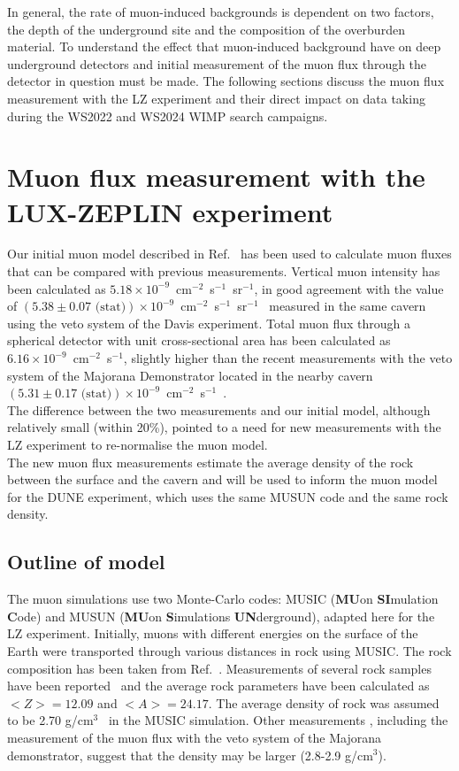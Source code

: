 In general, the rate of muon-induced backgrounds is dependent on two factors, the depth of the underground site and the composition of the overburden material. To understand the effect that muon-induced background have on deep underground detectors and initial measurement of the muon flux through the detector in question must be made. The following sections discuss the muon flux measurement with the LZ experiment and their direct impact on data taking during the WS2022 and WS2024 WIMP search campaigns.  

\section{Muon flux measurement with the LUX-ZEPLIN experiment}\label{sec:Muons/MuonFluxMeasurementWithLZ}
Our initial muon model described in Ref.~\cite{LZ_SIMS} has been used to calculate muon fluxes that can be compared with previous measurements. Vertical muon intensity has been calculated as $5.18\times10^{-9}$~cm$^{-2}$~s$^{-1}$~sr$^{-1}$, in good agreement with the value of $(5.38\pm0.07\text{ (stat)})\times10^{-9}$~cm$^{-2}$~s$^{-1}$~sr$^{-1}$~\cite{Cherry} measured in the same cavern using the veto system of the Davis experiment. Total muon flux through a spherical detector with unit cross-sectional area has been calculated as $6.16\times10^{-9}$~cm$^{-2}$~s$^{-1}$, slightly higher than the recent measurements with the veto system of the Majorana Demonstrator located in the nearby cavern $(5.31\pm0.17 \text{ (stat)})\times10^{-9}$~cm$^{-2}$~s$^{-1}$~\cite{majorana}.\\
The difference between the two measurements and our initial model, although relatively small (within 20\%), pointed to a need for new measurements with the LZ experiment to re-normalise the muon model.\\
The new muon flux measurements estimate the average density of the rock between the surface and the cavern and will be used to inform the muon model for the DUNE experiment\cite{DUNE}, which uses the same MUSUN code and the same rock density.

\subsection{Outline of model}\label{sec:Muons/ModelOutline}
The muon simulations use two Monte-Carlo codes: MUSIC (\textbf{MU}on \textbf{SI}mulation \textbf{C}ode) and MUSUN (\textbf{MU}on \textbf{S}imulations \textbf{UN}derground)\cite{music,musun}, adapted here for the LZ experiment. Initially, muons with different energies on the surface of the Earth were transported through various distances in rock using MUSIC. The rock composition has been taken from Ref.~\cite{mei,zhang}. Measurements of several rock samples have been reported~\cite{mei,zhang} and the average rock parameters have been calculated as $<Z>=12.09$ and $<A>=24.17$. The average density of rock was assumed to be 2.70 g/cm$^3$~\cite{zhang} in the MUSIC simulation. Other measurements \cite{heise}, including the measurement of the muon flux with the veto system of the Majorana demonstrator, suggest that the density may be larger (2.8-2.9 g/cm$^3$\cite{majorana}).

